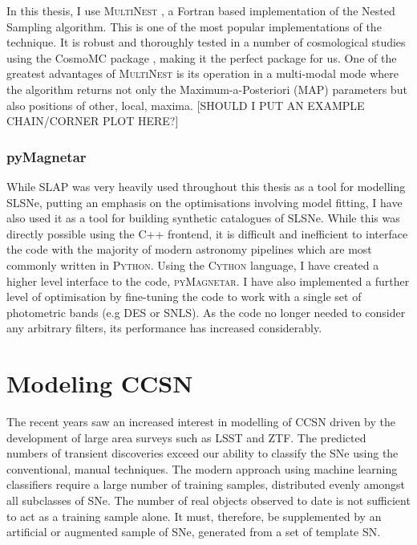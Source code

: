 In this thesis, I use \textsc{MultiNest} \citep{Feroz2009,Feroz2011,Feroz2013}, a Fortran based implementation of the Nested Sampling algorithm. This is one of the most popular implementations of the technique. It is robust and thoroughly tested in a number of cosmological studies using the CosmoMC package \citep{Lewis2002}, making it the perfect package for us. One of the greatest advantages of \textsc{MultiNest} is its operation in a multi-modal mode where the algorithm returns not only the Maximum-a-Posteriori (MAP) parameters but also positions of other, local, maxima. [SHOULD I PUT AN EXAMPLE CHAIN/CORNER PLOT HERE?]

\subsubsection{pyMagnetar}
While SLAP was very heavily used throughout this thesis as a tool for modelling SLSNe, putting an emphasis on the optimisations involving model fitting, I have also used it as a tool for building synthetic catalogues of SLSNe. While this was directly possible using the C++ frontend, it is difficult and inefficient to interface the code with the majority of modern astronomy pipelines which are most commonly written in \textsc{Python}. Using the \textsc{Cython} language, I have created a higher level interface to the code, \textsc{pyMagnetar}. I have also implemented a further level of optimisation by fine-tuning the code to work with a single set of photometric bands (e.g DES or SNLS). As the code no longer needed to consider any arbitrary filters, its performance has increased considerably.

\section{Modeling CCSN}
The recent years saw an increased interest in modelling of CCSN driven by the development of large area surveys such as LSST and ZTF. The predicted numbers of transient discoveries exceed our ability to classify the SNe using the conventional, manual techniques. The modern approach using machine learning classifiers require a large number of training samples, distributed evenly amongst all subclasses of SNe. The number of real objects observed to date is not sufficient to act as a training sample alone. It must, therefore, be supplemented by an artificial or augmented sample of SNe, generated from a set of template SN.


